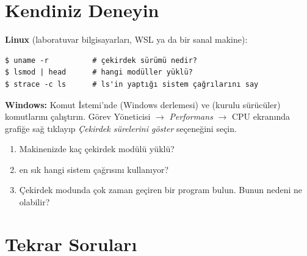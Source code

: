 \section{Kendiniz Deneyin}

\begin{tryit}
\textbf{Linux} (laboratuvar bilgisayarları, WSL ya da bir sanal makine):
\begin{lstlisting}[style=term]
$ uname -r          # çekirdek sürümü nedir?
$ lsmod | head      # hangi modüller yüklü?
$ strace -c ls      # ls'in yaptığı sistem çağrılarını say
\end{lstlisting}
\textbf{Windows:} Komut İstemi'nde  (Windows derlemesi) ve  (kurulu sürücüler) komutlarını çalıştırın. Görev Yöneticisi $\to$ \emph{Performans} $\to$ CPU ekranında grafiğe sağ tıklayıp \emph{Çekirdek sürelerini göster} seçeneğini seçin.
\begin{enumerate}[leftmargin=1.4em]
  \item Makinenizde kaç çekirdek modülü yüklü?
  \item {} en sık hangi sistem çağrısını kullanıyor?
  \item Çekirdek modunda çok zaman geçiren bir program bulun. Bunun nedeni ne olabilir?
\end{enumerate}
\end{tryit}

\section{Tekrar Soruları}

